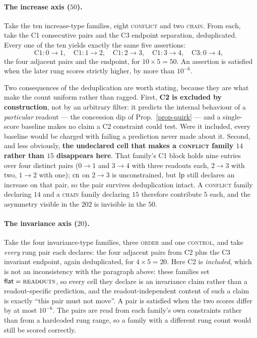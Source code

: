 \paragraph{The increase axis ($50$).} Take the ten increase-type families, eight \textsc{conflict} and
two \textsc{chain}. From each, take the C1 consecutive pairs and the C3 endpoint separation,
deduplicated. Every one of the ten yields exactly the same five assertions:
\[
  \text{C1}: 0\!\to\!1, \quad \text{C1}: 1\!\to\!2, \quad \text{C1}: 2\!\to\!3, \quad
  \text{C1}: 3\!\to\!4, \quad \text{C3}: 0\!\to\!4,
\]
the four adjacent pairs and the endpoint, for $10 \times 5 = 50$. An assertion is satisfied when the
later rung scores strictly higher, by more than $10^{-6}$.

Two consequences of the deduplication are worth stating, because they are what make the count uniform
rather than ragged. First, \textbf{C2 is excluded by construction}, not by an arbitrary filter: it
predicts the internal behaviour of a \emph{particular} readout --- the concession dip of
Prop.~\ref{prop-quirk} --- and a single-score baseline makes no claim a C2 constraint could test. Were
it included, every baseline would be charged with failing a prediction never made about it. Second, and
less obviously, \textbf{the undeclared cell that makes a \textsc{conflict} family $14$ rather than $15$
disappears here}. That family's C1 block holds nine entries over four distinct pairs
($0\!\to\!1$ and $3\!\to\!4$ with three readouts each, $2\!\to\!3$ with two, $1\!\to\!2$ with one);
$\mathrm{cn}$ on $2\!\to\!3$ is \textsf{unconstrained}, but $\mathrm{lp}$ still declares an increase on that pair, so
the pair survives deduplication intact. A \textsc{conflict} family declaring $14$ and a \textsc{chain}
family declaring $15$ therefore contribute $5$ each, and the asymmetry visible in the $202$ is invisible
in the $50$.

\paragraph{The invariance axis ($20$).} Take the four invariance-type families, three \textsc{order}
and one \textsc{control}, and take \emph{every} rung pair each declares: the four adjacent pairs from
C2 plus the C3 \textsf{invariant} endpoint, again deduplicated, for $4 \times 5 = 20$. Here C2 is
\emph{included}, which is not an inconsistency with the paragraph above: these families set
$\textsf{flat} = \textsc{readouts}$, so every cell they declare is an invariance claim rather than a
readout-specific prediction, and the readout-independent content of such a claim is exactly ``this pair
must not move''. A pair is satisfied when the two scores differ by at most $10^{-6}$. The pairs are read
from each family's own constraints rather than from a hardcoded rung range, so a family with a different
rung count would still be scored correctly.

